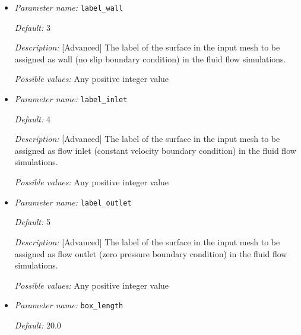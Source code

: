 \begin{itemize}
{\it Default:} 2 

{\it Description:} [Standard] The label of the (volume) region supposed to be the medium (electrolyte) in the input mesh.

{\it Possible values:} Any positive integer value 


\item {\it Parameter name:} {\tt label\_wall}
\label{parameters:label_wall}


{\it Default:} 3

{\it Description:} [Advanced] The label of the surface in the input mesh to be assigned as wall (no slip boundary condition) in the fluid flow simulations.

{\it Possible values:} Any positive integer value 


\item {\it Parameter name:} {\tt label\_inlet}
\label{parameters:label_inlet}


{\it Default:} 4

{\it Description:} [Advanced] The label of the surface in the input mesh to be assigned as flow inlet (constant velocity boundary condition) in the fluid flow simulations.

{\it Possible values:} Any positive integer value 


\item {\it Parameter name:} {\tt label\_outlet}
\label{parameters:label_outlet}


{\it Default:} 5

{\it Description:} [Advanced] The label of the surface in the input mesh to be assigned as flow outlet (zero pressure boundary condition) in the fluid flow simulations.

{\it Possible values:} Any positive integer value 


\item {\it Parameter name:} {\tt box\_length}
\label{parameters:box_length}


{\it Default:} 20.0


\end{itemize}
